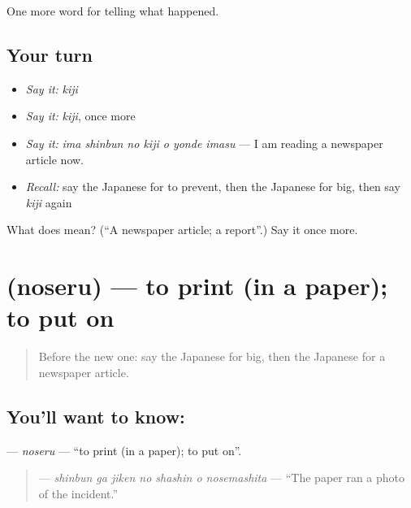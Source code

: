 \begin{grammarlens}[title={What you've built}]
One more word for telling what happened.
\end{grammarlens}

\subsection*{Your turn}
\begin{itemize}
\raggedright
  \item \emph{Say it:} \emph{kiji}
  \item \emph{Say it:} \emph{kiji}, once more
  \item \emph{Say it:} \emph{ima shinbun no kiji o yonde imasu} — I am reading a newspaper article now.
  \item \emph{Recall:} say the Japanese for to prevent, then the Japanese for big, then say \emph{kiji} again
\end{itemize}

\begin{tcolorbox}[breakable,colback=teal!4,colframe=teal!35!black,title={Before you move on}]
What does  mean? (\textquotedblleft{}A newspaper article; a report\textquotedblright{}.) Say it once more.
\end{tcolorbox}
\section[\texorpdfstring{\ja{のせる} (noseru)}{のせる (noseru)}]{ (noseru) — to print (in a paper); to put on}

\label{lesson:JA-C280-noseru}



\begin{quote}
Before the new one: say the Japanese for big, then the Japanese for a newspaper article.
\end{quote}

\subsection*{You'll want to know: }
\textbf{} — \emph{noseru} — \textquotedblleft{}to print (in a paper); to put on\textquotedblright{}.

\begin{quote}
\textbf{   } — \emph{shinbun ga jiken no shashin o nosemashita} — \textquotedblleft{}The paper ran a photo of the incident.\textquotedblright{}
\end{quote}

